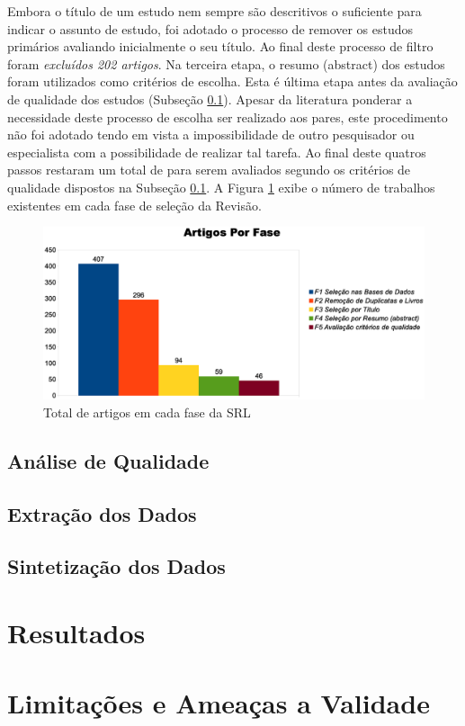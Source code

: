 \documentclass[12pt]{article}
\begin{document}
Embora o título de um estudo nem sempre são descritivos o suficiente para
indicar o assunto de estudo, foi adotado o processo de remover os estudos
primários avaliando inicialmente o seu título. Ao final deste processo de
filtro foram \textit{excluídos 202 artigos}. Na terceira etapa, o resumo
(abstract) dos estudos foram utilizados como critérios de escolha. Esta é
última etapa antes da avaliação de qualidade dos estudos (Subseção
\ref{subsec:analise-qualidade}). Apesar da literatura ponderar a necessidade
deste processo de escolha ser realizado aos pares, este procedimento não foi
adotado tendo em vista a impossibilidade de outro pesquisador ou especialista
com a possibilidade de realizar tal tarefa. Ao final deste quatros passos
restaram um total de para serem avaliados segundo os critérios de qualidade
dispostos na Subseção \ref{subsec:analise-qualidade}. A Figura \ref{fig:fases}
exibe o número de trabalhos existentes em cada fase de seleção da Revisão.


\begin{figure}[htb]
\centering
\includegraphics[width=.75\textwidth]{../img/graph_fases.eps}
\caption{Total de artigos em cada fase da SRL}
\label{fig:fases}
\end{figure}

\subsection{Análise de Qualidade}
\label{subsec:analise-qualidade}



\subsection{Extração dos Dados}
\label{subsec:extracao}

\subsection{Sintetização dos Dados}
\label{subsec:sintetizacao}

\section{Resultados}
\label{subsec:resultados}
\section{Limitações e Ameaças a Validade}
\label{sec:limitacoes}




\end{document}

